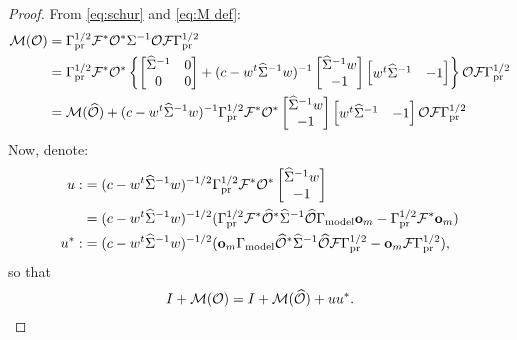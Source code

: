 \begin{proof}
  From \eqref{eq:schur} and \eqref{eq:M def}:
  \begin{align*}
    \mathcal{M}(\mathcal{O}) &= \Gamma_{\textup{pr}}^{1/2} \mathcal{F}^* \mathcal{O}^* \Sigma^{-1} \mathcal{O} \mathcal{F} \Gamma_{\textup{pr}}^{1/2} \\
    &= \Gamma_{\textup{pr}}^{1/2} \mathcal{F}^* \mathcal{O}^* \left \{
    \begin{bmatrix}
      \widehat{\Sigma}^{-1} & 0 \\
      0           & 0 
    \end{bmatrix}
    + (c -w^t \widehat{\Sigma}^{-1} w )^{-1}
    \begin{bmatrix}
      \widehat{\Sigma}^{-1} w \\
      -1
    \end{bmatrix}
    \begin{bmatrix}
      w^t \widehat{\Sigma}^{-1} & -1 
    \end{bmatrix} 
    \right \} \mathcal{O} \mathcal{F} \Gamma_{\textup{pr}}^{1/2} \\
    &= \mathcal{M} (\widehat{\mathcal{O}}) + (c -w^t \widehat{\Sigma}^{-1} w )^{-1}
    \Gamma_{\textup{pr}}^{1/2} \mathcal{F}^* \mathcal{O}^*
    \begin{bmatrix}
      \widehat{\Sigma}^{-1} w \\
      -1
    \end{bmatrix}
    \begin{bmatrix}
      w^t \widehat{\Sigma}^{-1} & -1 
    \end{bmatrix} 
    \mathcal{O} \mathcal{F} \Gamma_{\textup{pr}}^{1/2}
  \end{align*}
  Now, denote:
  \begin{align}\label{eq:u}
    \begin{split}
      u :&= (c -w^t \widehat{\Sigma}^{-1} w )^{-1/2}
      \Gamma_{\textup{pr}}^{1/2} \mathcal{F}^* \mathcal{O}^* 
      \begin{bmatrix}
        \widehat{\Sigma}^{-1} w \\
        -1 
      \end{bmatrix} \\
      & = (c -w^t \widehat{\Sigma}^{-1} w )^{-1/2} ( \Gamma_{\textup{pr}}^{1/2}\mathcal{F}^* \widehat{\mathcal{O}}^* \widehat{\Sigma}^{-1} \widehat{\mathcal{O}}  \Gamma_{\textup{model}} \mathbf{o}_m - \Gamma_{\textup{pr}}^{1/2} \mathcal{F}^* \mathbf{o}_m )\\
      u^* :&=  (c -w^t \widehat{\Sigma}^{-1} w )^{-1/2} (\mathbf{o}_m \Gamma_{\textup{model}} \widehat{\mathcal{O}}^* \widehat{\Sigma}^{-1} \widehat{\mathcal{O}} \mathcal{F} \Gamma_{\textup{pr}}^{1/2} - \mathbf{o}_m \mathcal{F} \Gamma_{\textup{pr}}^{1/2} ),
    \end{split}
  \end{align}
  so that
  \begin{equation}\label{eq:M plus I}
    I + \mathcal{M}( \mathcal{O} ) = I + \mathcal{M} (\widehat{\mathcal{O}} ) + uu^*.
  \end{equation}

\end{proof}
